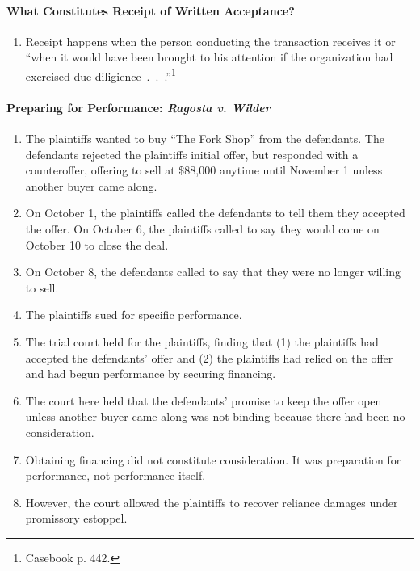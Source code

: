 \paragraph{What Constitutes Receipt of Written Acceptance?}

\begin{enumerate}
    \item Receipt happens when the person conducting the transaction receives 
    it or ``when it would have been brought to his attention if the 
    organization had exercised due diligience~.~.~.''\footnote{Casebook p. 
    442.}
\end{enumerate}

\paragraph{Preparing for Performance: \emph{Ragosta v. Wilder}}

\begin{enumerate}
    \item The plaintiffs wanted to buy ``The Fork Shop'' from the defendants. 
    The defendants rejected the plaintiffs initial offer, but responded with a 
    counteroffer, offering to sell at \$88,000 anytime until November 1 unless 
    another buyer came along.
    \item On October 1, the plaintiffs called the defendants to tell them they 
    accepted the offer. On October 6, the plaintiffs called to say they would 
    come on October 10 to close the deal.
    \item On October 8, the defendants called to say that they were no longer 
    willing to sell.
    \item The plaintiffs sued for specific performance.
    \item The trial court held for the plaintiffs, finding that (1) the 
    plaintiffs had accepted the defendants' offer and (2) the plaintiffs had 
    relied on the offer and had begun performance by securing financing.
    \item The court here held that the defendants' promise to keep the offer 
    open unless another buyer came along was not binding because there had 
    been no consideration.
    \item Obtaining financing did not constitute consideration. It was 
    preparation for performance, not performance itself.
    \item However, the court allowed the plaintiffs to recover reliance 
    damages under promissory estoppel.
\end{enumerate}

